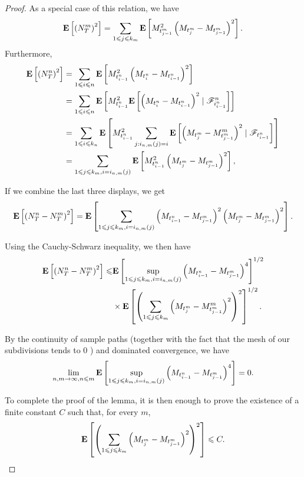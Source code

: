 \begin{proof}
		As a special case of this relation, we have
		$$
		{\mathbf E}\left[\left(N_T^m\right)^2\right]=\sum_{1 \leqslant j \leqslant k_m} {\mathbf E}\left[M_{t_{j-1}^m}^2\left(M_{t_j^m}-M_{t_{j-1}^m}\right)^2\right] .
		$$
		Furthermore,
		\begin{equation*}
			\begin{aligned}
				{\mathbf E}\left[\left(N_T^n\right)^2\right] & =\sum_{1 \leqslant i \leqslant n} {\mathbf E}\left[M_{t_{i-1}^n}^2\left(M_{t_i^n}-M_{t_{i-1}^n}\right)^2\right] \\
				& =\sum_{1 \leqslant i \leqslant n} {\mathbf E}\left[M_{t_{i-1}^n}^2 {\mathbf E}\left[\left(M_{t_i^n}-M_{t_{i-1}^n}\right)^2 \mid \mathscr{F}_{i_{i-1}^n}^n\right]\right] \\
				& =\sum_{1 \leqslant i \leqslant k_n} {\mathbf E}\left[M_{t_{i-1}^n}^2 \sum_{j: i_{n, m}(j)=i} {\mathbf E}\left[\left(M_{t_j^m}-M_{t_{j-1}^m}^m\right)^2 \mid \mathscr{F}_{t_{i-1}^n}\right]\right] \\
				& =\sum_{1 \leqslant j \leqslant k_m, i=i_{n, m}(j)} {\mathbf E}\left[M_{t_{i-1}^n}^2\left(M_{t_j^m}-M_{t_{j-1}^m}\right)^2\right],
			\end{aligned}
		\end{equation*}
		
		If we combine the last three displays, we get
		$$
		{\mathbf E}\left[\left(N_T^n-N_T^m\right)^2\right]={\mathbf E}\left[\sum_{1 \leqslant j \leqslant k_m, i=i_{n, m}(j)}\left(M_{t_{i-1}^n}-M_{t_{j-1}^m}\right)^2\left(M_{t_j^m}-M_{t_{j-1}^m}\right)^2\right] .
		$$
		
		Using the Cauchy-Schwarz inequality, we then have
		$$
		\begin{aligned}
			{\mathbf E}\left[\left(N_T^n-N_T^m\right)^2\right] \leqslant & {\mathbf E}\left[\sup _{1 \leqslant j \leqslant k_m, i=i_{n, m}(j)}\left(M_{t_{i-1}^n}-M_{t_{j-1}^m}\right)^4\right]^{1 / 2} \\
			& \times {\mathbf E}\left[\left(\sum_{1 \leqslant j \leqslant k_m}\left(M_{t_j^m}-M_{t_{j-1}^m}^m\right)^2\right)^2\right]^{1 / 2} .
		\end{aligned}
		$$
		
		By the continuity of sample paths (together with the fact that the mesh of our subdivisions tends to 0 ) and dominated convergence, we have
		$$
		\lim _{n, m \rightarrow \infty, n \leqslant m} {\mathbf E}\left[\sup _{1 \leqslant j \leqslant k_m, i=i_{n, m}(j)}\left(M_{t_{i-1}^n}-M_{t_{j-1}^m}\right)^4\right]=0 .
		$$
		
		To complete the proof of the lemma, it is then enough to prove the existence of a finite constant $C$ such that, for every $m$,
		$$
		{\mathbf E}\left[\left(\sum_{1 \leqslant j \leqslant k_m}\left(M_{t_j^m}-M_{t_{j-1}^m}\right)^2\right)^2\right] \leqslant C .
		$$
		

\end{proof}
